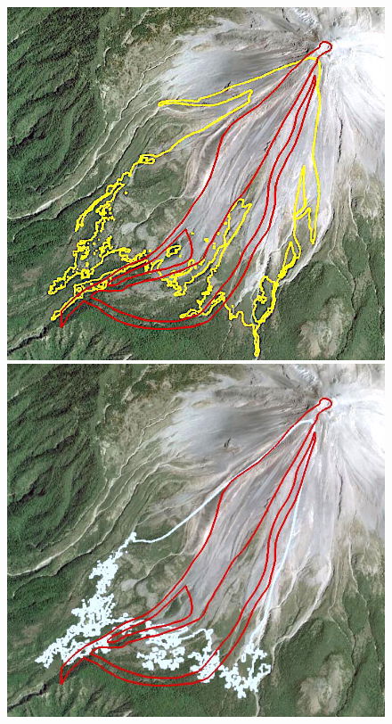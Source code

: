 \documentclass[review]{elsarticle}
\begin{document}
\begin{figure}[H]
\begin{minipage}[b]{.5\textwidth}
        \centering
                \includegraphics[width=1\textwidth]{IMAGES/tiny1.png}
                \includegraphics[width=1\textwidth]{IMAGES/levelset1.png}

\end{minipage}
\end{figure}
\end{document}
